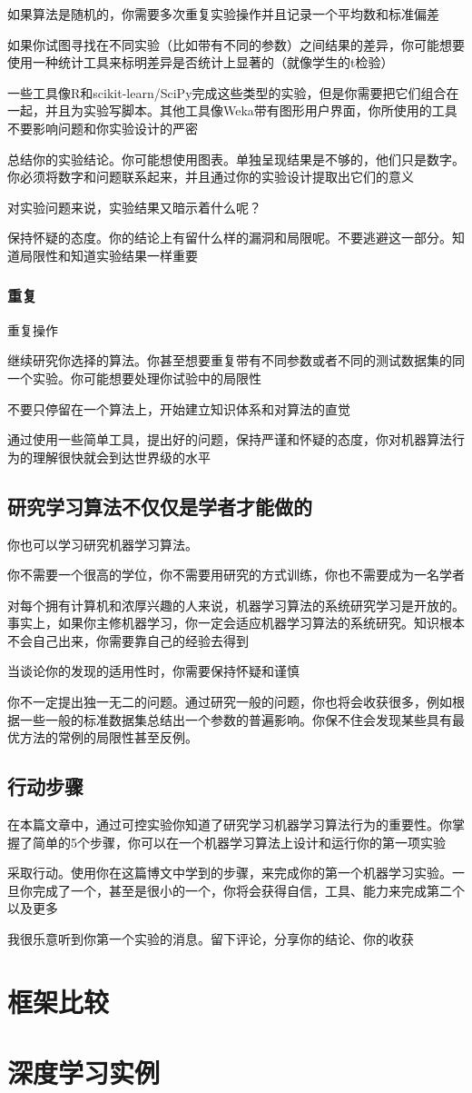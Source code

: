 \documentclass[a4paper,12pt]{ctexbook}
\begin{document}
如果算法是随机的，你需要多次重复实验操作并且记录一个平均数和标准偏差

如果你试图寻找在不同实验（比如带有不同的参数）之间结果的差异，你可能想要使用一种统计工具来标明差异是否统计上显著的（就像学生的t检验）

一些工具像R和scikit-learn/SciPy完成这些类型的实验，但是你需要把它们组合在一起，并且为实验写脚本。其他工具像Weka带有图形用户界面，你所使用的工具不要影响问题和你实验设计的严密

总结你的实验结论。你可能想使用图表。单独呈现结果是不够的，他们只是数字。你必须将数字和问题联系起来，并且通过你的实验设计提取出它们的意义

对实验问题来说，实验结果又暗示着什么呢？

保持怀疑的态度。你的结论上有留什么样的漏洞和局限呢。不要逃避这一部分。知道局限性和知道实验结果一样重要
\subsection{重复}
重复操作

继续研究你选择的算法。你甚至想要重复带有不同参数或者不同的测试数据集的同一个实验。你可能想要处理你试验中的局限性

不要只停留在一个算法上，开始建立知识体系和对算法的直觉

通过使用一些简单工具，提出好的问题，保持严谨和怀疑的态度，你对机器算法行为的理解很快就会到达世界级的水平
\section{研究学习算法不仅仅是学者才能做的}
你也可以学习研究机器学习算法。

你不需要一个很高的学位，你不需要用研究的方式训练，你也不需要成为一名学者

对每个拥有计算机和浓厚兴趣的人来说，机器学习算法的系统研究学习是开放的。事实上，如果你主修机器学习，你一定会适应机器学习算法的系统研究。知识根本不会自己出来，你需要靠自己的经验去得到

当谈论你的发现的适用性时，你需要保持怀疑和谨慎

你不一定提出独一无二的问题。通过研究一般的问题，你也将会收获很多，例如根据一些一般的标准数据集总结出一个参数的普遍影响。你保不住会发现某些具有最优方法的常例的局限性甚至反例。

\section{行动步骤}
在本篇文章中，通过可控实验你知道了研究学习机器学习算法行为的重要性。你掌握了简单的5个步骤，你可以在一个机器学习算法上设计和运行你的第一项实验

采取行动。使用你在这篇博文中学到的步骤，来完成你的第一个机器学习实验。一旦你完成了一个，甚至是很小的一个，你将会获得自信，工具、能力来完成第二个以及更多

我很乐意听到你第一个实验的消息。留下评论，分享你的结论、你的收获

\chapter{框架比较}


\chapter{深度学习实例}



\end{document}
